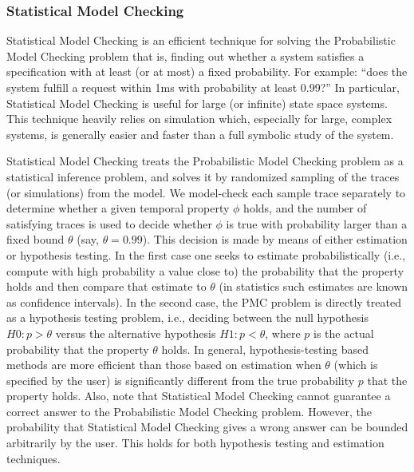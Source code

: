 \subsubsection{Statistical Model Checking}

Statistical Model Checking is an efficient technique for solving the Probabilistic Model Checking problem that is, finding out whether a system satisfies a specification with at least (or at most) a fixed probability. For example: “does the system fulfill a request within 1ms with probability at least 0.99?” In particular, Statistical Model Checking is useful for large (or infinite) state space systems. This technique heavily relies on simulation which, especially for large, complex systems, is generally easier and faster than a full symbolic study of the system.

Statistical Model Checking treats the Probabilistic Model Checking problem as a statistical inference problem, and solves it by randomized sampling of the traces (or simulations) from the model. We model-check each sample trace separately to determine whether a given temporal property $\phi$ holds, and the number of satisfying traces is used to decide whether $\phi$ is true with probability larger than a fixed bound $\theta$ (say, $\theta=0.99$). This decision is made by means of either estimation or hypothesis testing. In the first case one seeks to estimate probabilistically (i.e., compute with high probability a value close to) the probability that the property holds and then compare that estimate to $\theta$ (in statistics such estimates are known as confidence intervals). In the second case, the PMC problem is directly treated as a hypothesis testing problem, i.e., deciding between the null hypothesis $H0: p>θ$ versus the alternative hypothesis $H1: p < θ$, where $p$ is the actual probability that the property $\theta$ holds. In general, hypothesis-testing based methods are more efficient than those based on estimation when $\theta$ (which is specified by the user) is significantly different from the true probability $p$ that the property holds. Also, note that Statistical Model Checking cannot guarantee a correct answer to the Probabilistic Model Checking problem. However, the probability that Statistical Model Checking gives a wrong answer can be bounded arbitrarily by the user. This holds for both hypothesis testing and estimation techniques.

